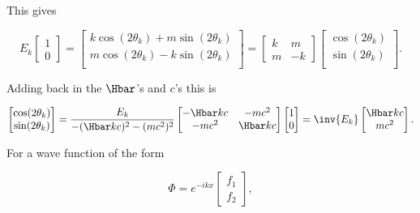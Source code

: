 {This gives

\begin{dmath}\label{eqn:qmLecture9Problems:320}
E_k 
\begin{bmatrix}
1 \\
0
\end{bmatrix}
=
\begin{bmatrix}
k \cos(2 \theta_k) + m \sin(2 \theta_k) \\
m \cos(2 \theta_k) - k \sin(2 \theta_k) \\
\end{bmatrix}
=
\begin{bmatrix}
k & m \\
m & -k
\end{bmatrix}
\begin{bmatrix}
\cos(2 \theta_k) \\
\sin(2 \theta_k) \\
\end{bmatrix}.
\end{dmath}

Adding back in the \(\Hbar\)'s and \(c\)'s this is

\begin{dmath}\label{eqn:qmLecture9Problems:340}
\begin{bmatrix}
\cos(2 \theta_k) \\
\sin(2 \theta_k) \\
\end{bmatrix}
=
\frac{E_k}{-(\Hbar k c)^2 -(m c^2)^2}
\begin{bmatrix}
- \Hbar k c & - m c^2 \\
- m c^2     & \Hbar k c
\end{bmatrix}
\begin{bmatrix}
1 \\
0
\end{bmatrix}
=
\inv{E_k}
\begin{bmatrix}
\Hbar k c \\
m c^2
\end{bmatrix}.
\end{dmath}


For a wave function of the form

\begin{dmath}\label{eqn:qmLecture9Problems:440}
\Phi = 
e^{-i k x} 
\begin{bmatrix}
f_1 \\
f_2
\end{bmatrix},
\end{dmath}

}

